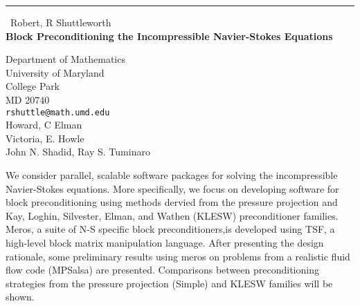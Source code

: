 \documentclass{report}
\begin{document}
\begin{center}
\rule{6in}{1pt} \
{\large Robert, R Shuttleworth \\
{\bf Block Preconditioning the Incompressible Navier-Stokes Equations}}

Department of Mathematics \\ University of Maryland  \\ College Park \\ MD 20740
\\
{\tt rshuttle@math.umd.edu}\\
Howard, C Elman\\
Victoria, E. Howle\\
	John N. Shadid, Ray S. Tuminaro\end{center}

We consider parallel, scalable software packages for solving the
incompressible Navier-Stokes equations. More specifically, we focus on
developing software for block preconditioning using
methods dervied from the pressure projection and Kay, Loghin, Silvester,
Elman, and Wathen (KLESW) preconditioner families.
Meros, a suite of N-S specific block preconditioners,is developed using
TSF, a high-level block matrix manipulation language. After presenting
the design rationale, some preliminary results using meros on problems
from a realistic fluid flow code (MPSalsa) are presented. Comparisons
between preconditioning strategies from the pressure projection (Simple)
and KLESW families will be shown.
\end{document}
